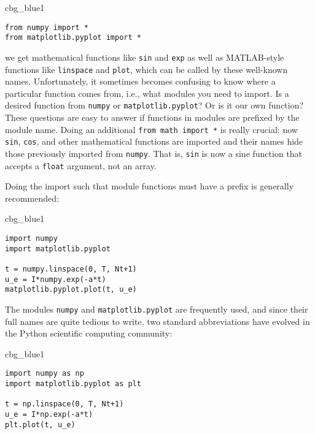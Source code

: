 \documentclass[graybox,sectrefs,envcountresetchap,open=right,final]{svmonodo}
\newenvironment{_cod_tight}[1]{
   \def\FrameCommand{\colorbox{#1}}
   \FrameRule0.6pt\MakeFramed {\FrameRestore}\vskip3mm}
   {\vskip0mm\endMakeFramed}
\newenvironment{cod}[1]{
\bgroup\rmfamily
\fboxsep=0mm\relax
\begin{_cod_tight}{#1}
\list{}{\parsep=-2mm\parskip=0mm\topsep=0pt\leftmargin=2mm
\rightmargin=2\leftmargin\leftmargin=4pt\relax}
\item\relax}
{\endlist\end{_cod_tight}\egroup}
\begin{document}
\begin{cod}{cbg_blue1}\begin{Verbatim}[numbers=none,fontsize=\fontsize{9pt}{9pt},baselinestretch=0.95,xleftmargin=2mm]
from numpy import *
from matplotlib.pyplot import *
\end{Verbatim}
\end{cod}
\noindent
we get mathematical functions like \texttt{sin} and \texttt{exp} as well as
MATLAB-style functions like \texttt{linspace} and \texttt{plot}, which can be called
by these well-known names.  Unfortunately, it sometimes becomes
confusing to know where a particular function comes from, i.e., what
modules you need to import. Is a desired function from \texttt{numpy} or
\texttt{matplotlib.pyplot}? Or is it our own function?  These questions are
easy to answer if functions in modules are prefixed by the module
name. Doing an additional \texttt{from math import *} is really crucial: now
\texttt{sin}, \texttt{cos}, and other mathematical functions are imported and their
names hide those previously imported from \texttt{numpy}.  That is, \texttt{sin} is
now a sine function that accepts a \texttt{float} argument, not an array.

Doing the import such that module functions must have a prefix
is generally recommended:

\begin{cod}{cbg_blue1}\begin{Verbatim}[numbers=none,fontsize=\fontsize{9pt}{9pt},baselinestretch=0.95,xleftmargin=2mm]
import numpy
import matplotlib.pyplot

t = numpy.linspace(0, T, Nt+1)
u_e = I*numpy.exp(-a*t)
matplotlib.pyplot.plot(t, u_e)
\end{Verbatim}
\end{cod}
\noindent

The modules \texttt{numpy} and \texttt{matplotlib.pyplot} are frequently used,
and since their full names are quite tedious to write,
two standard abbreviations
have evolved in the Python scientific computing community:

\begin{cod}{cbg_blue1}\begin{Verbatim}[numbers=none,fontsize=\fontsize{9pt}{9pt},baselinestretch=0.95,xleftmargin=2mm]
import numpy as np
import matplotlib.pyplot as plt

t = np.linspace(0, T, Nt+1)
u_e = I*np.exp(-a*t)
plt.plot(t, u_e)
\end{Verbatim}
\end{cod}
\noindent
\end{document}
